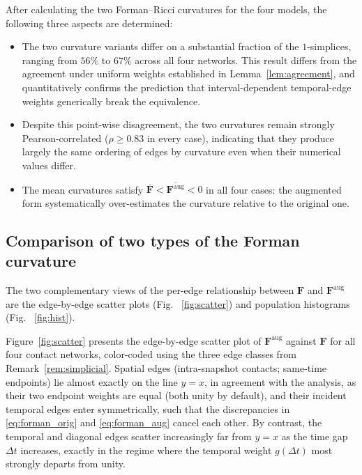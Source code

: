 \documentclass[
    pre,
    twocolumn,
    superscriptaddress,
    showpacs,
    nofootinbib,
    amsmath,
    amssymb,
    floatfix
]{revtex4-2}
\newcommand{\F}{\mathbf{F}}        %
\newcommand{\Faug}{\F^{\mathrm{aug}}}
\newcommand{\dt}{\Delta t}
\theoremstyle{plain} %
\theoremstyle{definition} %
\begin{document}
After calculating the two Forman--Ricci curvatures for the four models, the following three aspects are determined:
\begin{itemize}
    \item %
    The two curvature variants differ on a substantial fraction of the $1$-simplices, ranging from $56\%$ to $67\%$ across all four networks.
    This result differs from the agreement under uniform weights established in Lemma~\ref{lem:agreement}, and quantitatively confirms the prediction that interval-dependent temporal-edge weights generically break the equivalence.
    \item %
    Despite this point-wise disagreement, the two curvatures remain strongly Pearson-correlated ($\rho\geq 0.83$ in every case), indicating that they produce largely the same ordering of edges by curvature even when their numerical values differ. 
    \item The mean curvatures satisfy $\overline{\F}<\overline{\Faug}<0$ in all four cases: the augmented form systematically over-estimates the curvature relative to the original one.
\end{itemize}  

\subsection{Comparison of two types of the Forman curvature}

The two complementary views of the per-edge relationship between $\F$ and $\Faug$ are the edge-by-edge scatter plots (Fig. ~\ref{fig:scatter}) and population histograms (Fig. ~\ref{fig:hist}).

Figure~\ref{fig:scatter} presents the edge-by-edge scatter plot of $\Faug$ against $\F$ for all four contact networks, color-coded using the three edge classes from Remark~\ref{rem:simplicial}.
Spatial edges (intra-snapshot contacts; same-time endpoints) lie almost exactly on the line $y=x$, in agreement with the analysis, as their two endpoint weights are equal (both unity by default), and their incident temporal edges enter symmetrically, such that the discrepancies in \eqref{eq:forman_orig} and \eqref{eq:forman_aug} cancel each other.
By contrast, the temporal and diagonal edges scatter increasingly far from $y=x$ as the time gap $\dt$ increases, exactly in the regime where the temporal weight $g(\dt)$ most strongly departs from unity.
\end{document}
